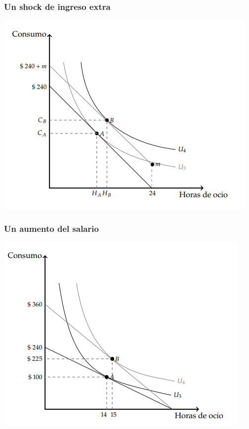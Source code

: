 \documentclass{beamer}
\begin{document}
\begin{frame}
  \frametitle{Un shock de ingreso extra}
  \begin{center}
    \includegraphics[scale=0.9]{../Figures/C9.7.png}
  \end{center}
\end{frame}

\begin{frame}
  \frametitle{Un aumento del salario}
  \begin{center}
    \includegraphics[scale=0.9]{../Figures/C9.8.png}
  \end{center}
\end{frame}
\end{document}
